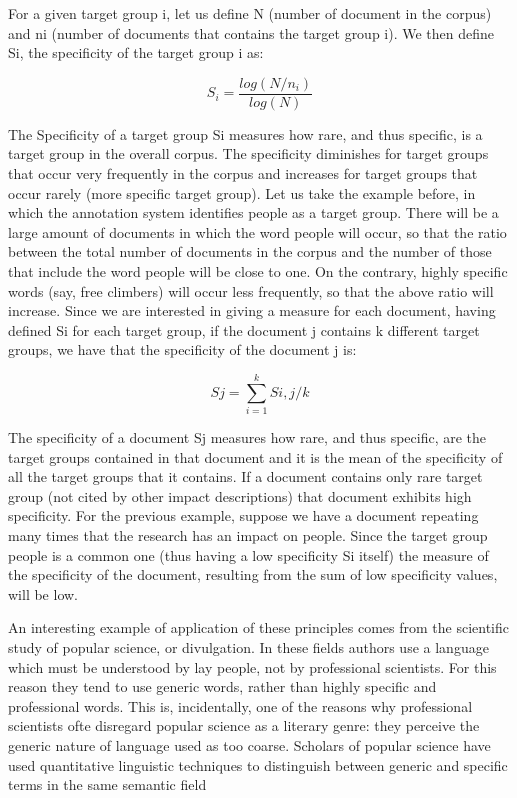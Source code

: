 \documentclass[]{book}
\begin{document}
For a given target group i, let us define N (number of document in the
corpus) and ni (number of documents that contains the target group i).
We then define Si, the specificity of the target group i as:

\begin{equation*} 
S_i= \frac{log(N/n_i)}{log(N)}
\end{equation*}

The Specificity of a target group Si measures how rare, and thus
specific, is a target group in the overall corpus. The specificity
diminishes for target groups that occur very frequently in the corpus
and increases for target groups that occur rarely (more specific target
group). Let us take the example before, in which the annotation system
identifies people as a target group. There will be a large amount of
documents in which the word people will occur, so that the ratio between
the total number of documents in the corpus and the number of those that
include the word people will be close to one. On the contrary, highly
specific words (say, free climbers) will occur less frequently, so that
the above ratio will increase. Since we are interested in giving a
measure for each document, having defined Si for each target group, if
the document j contains k different target groups, we have that the
specificity of the document j is:

\begin{equation*} 
Sj=\sum_{i=1}^{k}Si,j/k
\end{equation*}

The specificity of a document Sj measures how rare, and thus specific,
are the target groups contained in that document and it is the mean of
the specificity of all the target groups that it contains. If a document
contains only rare target group (not cited by other impact descriptions)
that document exhibits high specificity. For the previous example,
suppose we have a document repeating many times that the research has an
impact on people. Since the target group people is a common one (thus
having a low specificity Si itself) the measure of the specificity of
the document, resulting from the sum of low specificity values, will be
low.

An interesting example of application of these principles comes from the
scientific study of popular science, or divulgation. In these fields
authors use a language which must be understood by lay people, not by
professional scientists. For this reason they tend to use generic words,
rather than highly specific and professional words. This is,
incidentally, one of the reasons why professional scientists ofte
disregard popular science as a literary genre: they perceive the generic
nature of language used as too coarse. Scholars of popular science have
used quantitative linguistic techniques to distinguish between generic
and specific terms in the same semantic field
\citep{jacobi1999communication}
\end{document}
